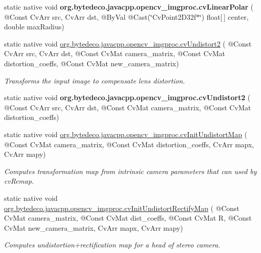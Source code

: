 \begin{DoxyCompactItemize}
\item 
\mbox{\label{group__imgproc__c_ga6d3f9c3c80a21fb157c689a46bbe3ddb}} 
static native void {\bfseries org.\+bytedeco.\+javacpp.\+opencv\+\_\+imgproc.\+cv\+Linear\+Polar} ( @Const Cv\+Arr src, Cv\+Arr dst, @By\+Val @Cast(\char`\"{}Cv\+Point2\+D32f$\ast$\char`\"{}) float\mbox{[}$\,$\mbox{]} center, double max\+Radius)
\item 
static native void \hyperlink{group__imgproc__c_ga2b891154762834fb030334ea95ebdce9}{org.\+bytedeco.\+javacpp.\+opencv\+\_\+imgproc.\+cv\+Undistort2} ( @Const Cv\+Arr src, Cv\+Arr dst, @Const Cv\+Mat camera\+\_\+matrix, @Const Cv\+Mat distortion\+\_\+coeffs, @Const Cv\+Mat new\+\_\+camera\+\_\+matrix)
\begin{DoxyCompactList}\small\item\em Transforms the input image to compensate lens distortion. \end{DoxyCompactList}\item 
\mbox{\label{group__imgproc__c_ga69b1ac0e7d88dd855287dddb31194665}} 
static native void {\bfseries org.\+bytedeco.\+javacpp.\+opencv\+\_\+imgproc.\+cv\+Undistort2} ( @Const Cv\+Arr src, Cv\+Arr dst, @Const Cv\+Mat camera\+\_\+matrix, @Const Cv\+Mat distortion\+\_\+coeffs)
\item 
\mbox{\label{group__imgproc__c_gabf5495653e45cb87934afd107d253eba}} 
static native void \hyperlink{group__imgproc__c_gabf5495653e45cb87934afd107d253eba}{org.\+bytedeco.\+javacpp.\+opencv\+\_\+imgproc.\+cv\+Init\+Undistort\+Map} ( @Const Cv\+Mat camera\+\_\+matrix, @Const Cv\+Mat distortion\+\_\+coeffs, Cv\+Arr mapx, Cv\+Arr mapy)
\begin{DoxyCompactList}\small\item\em Computes transformation map from intrinsic camera parameters that can used by cv\+Remap. \end{DoxyCompactList}\item 
static native void \hyperlink{group__imgproc__c_gab25847a22028fe0d1088d6572aca641a}{org.\+bytedeco.\+javacpp.\+opencv\+\_\+imgproc.\+cv\+Init\+Undistort\+Rectify\+Map} ( @Const Cv\+Mat camera\+\_\+matrix, @Const Cv\+Mat dist\+\_\+coeffs, @Const Cv\+Mat R, @Const Cv\+Mat new\+\_\+camera\+\_\+matrix, Cv\+Arr mapx, Cv\+Arr mapy)
\begin{DoxyCompactList}\small\item\em Computes undistortion+rectification map for a head of stereo camera. \end{DoxyCompactList}\item 

\end{DoxyCompactItemize}
